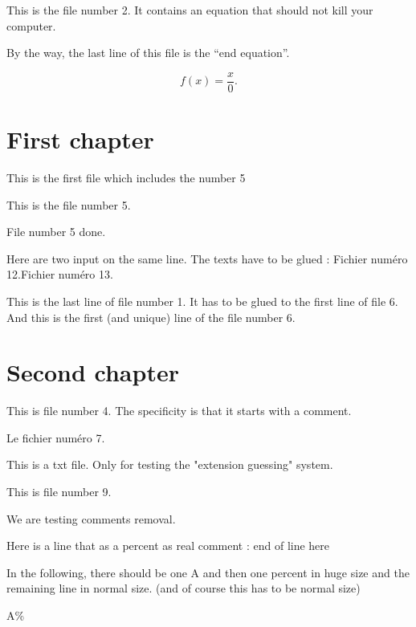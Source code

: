 \documentclass[a4paper,oneside,11pt]{book}
\begin{document}
 

 


%
    This is the file number 2. It contains an equation that should not kill your computer.

By the way, the last line of this file is the ``end equation''.

\begin{equation}
    f(x)=\frac{ x }{ 0 }.
\end{equation}
  

\tableofcontents

\chapter{First chapter}
This is the first file which includes the number 5

This is the file number 5.      %

File number 5 done. 

Here are two input on the same line. The texts have to be glued :
Fichier numéro 12.Fichier numéro 13.

This is the last line of file number 1. It has to be glued to the first line of file 6.
And this is the first (and unique) line of the file number 6.

\chapter{Second chapter}
%
This is file number 4. The specificity is that it starts with a comment.


Le fichier numéro 7.


This is a txt file. Only for testing the "extension guessing" system.

This is file number 9.

We are testing comments removal. 

Here is a line that as a percent as real comment : end of line here%


In the following, there should be one A and then one percent in huge size and the remaining line in normal size. (and of course this has to be normal size)

\huge

A\% 
\end{document}
